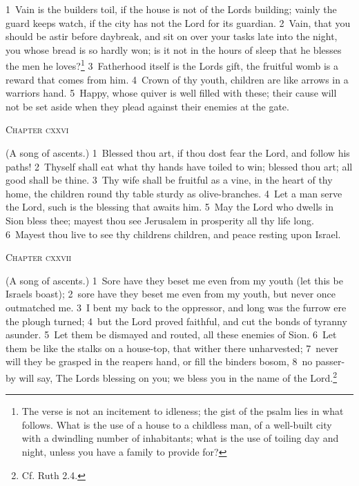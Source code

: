 \documentclass[10pt]{book} %
\begin{document}
\textcolor{benred8}{1}~Vain is the builder\textquotesingle s toil, if the house is not of the Lord\textquotesingle s building; vainly the guard keeps watch, if the city has not the Lord for its guardian. \textcolor{benred8}{2}~Vain, that you should be astir before daybreak, and sit on over your tasks late into the night, you whose bread is so hardly won; is it not in the hours of sleep that he blesses the men he loves?\footnote[1]{The verse is not an incitement to idleness; the gist of the psalm lies in what follows. What is the use of a house to a childless man, of a well-built city with a dwindling number of inhabitants; what is the use of toiling day and night, unless you have a family to provide for?} \textcolor{benred8}{3}~Fatherhood itself is the Lord\textquotesingle s gift, the fruitful womb is a reward that comes from him. \textcolor{benred8}{4}~Crown of thy youth, children are like arrows in a warrior\textquotesingle s hand. \textcolor{benred8}{5}~Happy, whose quiver is well filled with these; their cause will not be set aside when they plead against their enemies at the gate.
\begin{large}\begin{center}\textsc{Chapter cxxvi}\end{center}\end{large}
(A song of ascents.)
\textcolor{benred8}{1}~Blessed thou art, if thou dost fear the Lord, and follow his paths! \textcolor{benred8}{2}~Thyself shall eat what thy hands have toiled to win; blessed thou art; all good shall be thine. \textcolor{benred8}{3}~Thy wife shall be fruitful as a vine, in the heart of thy home, the children round thy table sturdy as olive-branches. \textcolor{benred8}{4}~Let a man serve the Lord, such is the blessing that awaits him. \textcolor{benred8}{5}~May the Lord who dwells in Sion bless thee; mayest thou see Jerusalem in prosperity all thy life long. \textcolor{benred8}{6}~Mayest thou live to see thy children\textquotesingle s children, and peace resting upon Israel.
\begin{large}\begin{center}\textsc{Chapter cxxvii}\end{center}\end{large}
(A song of ascents.)
\textcolor{benred8}{1}~Sore have they beset me even from my youth (let this be Israel\textquotesingle s boast); \textcolor{benred8}{2}~sore have they beset me even from my youth, but never once outmatched me. \textcolor{benred8}{3}~I bent my back to the oppressor, and long was the furrow ere the plough turned; \textcolor{benred8}{4}~but the Lord proved faithful, and cut the bonds of tyranny asunder. \textcolor{benred8}{5}~Let them be dismayed and routed, all these enemies of Sion. \textcolor{benred8}{6}~Let them be like the stalks on a house-top, that wither there unharvested; \textcolor{benred8}{7}~never will they be grasped in the reaper\textquotesingle s hand, or fill the binder\textquotesingle s bosom, \textcolor{benred8}{8}~no passer-by will say, The Lord\textquotesingle s blessing on you; we bless you in the name of the Lord.\footnote[1]{Cf. Ruth 2.4.}
\end{document}
